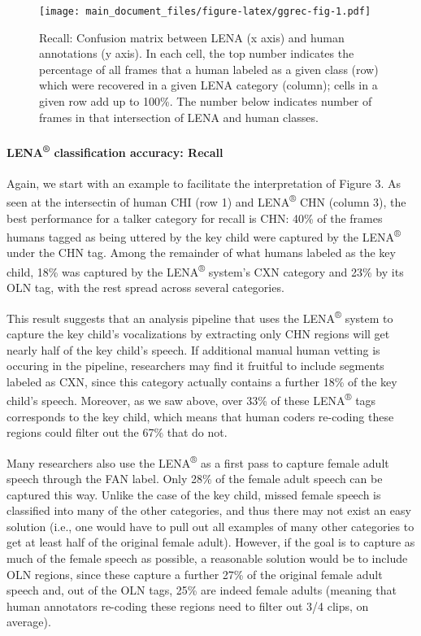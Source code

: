 \documentclass[english,floatsintext,man]{apa6}
\begin{document}
\begin{figure}
\centering
\texttt{[image: main\_document\_files/figure-latex/ggrec-fig-1.pdf]}
\caption{\label{fig:ggrec-fig}Recall: Confusion matrix between LENA (x axis)
and human annotations (y axis). In each cell, the top number indicates
the percentage of all frames that a human labeled as a given class (row)
which were recovered in a given LENA category (column); cells in a given
row add up to 100\%. The number below indicates number of frames in that
intersection of LENA and human classes.}
\end{figure}

\paragraph{\texorpdfstring{LENA\textsuperscript{®} classification
accuracy:
Recall}{LENA® classification accuracy: Recall}}\label{lena-classification-accuracy-recall}

Again, we start with an example to facilitate the interpretation of
Figure 3. As seen at the intersectin of human CHI (row 1) and
LENA\textsuperscript{®} CHN (column 3), the best performance for a
talker category for recall is CHN: 40\% of the frames humans tagged as
being uttered by the key child were captured by the
LENA\textsuperscript{®} under the CHN tag. Among the remainder of what
humans labeled as the key child, 18\% was captured by the
LENA\textsuperscript{®} system's CXN category and 23\% by its OLN tag,
with the rest spread across several categories.

This result suggests that an analysis pipeline that uses the
LENA\textsuperscript{®} system to capture the key child's vocalizations
by extracting only CHN regions will get nearly half of the key child's
speech. If additional manual human vetting is occuring in the pipeline,
researchers may find it fruitful to include segments labeled as CXN,
since this category actually contains a further 18\% of the key child's
speech. Moreover, as we saw above, over 33\% of these
LENA\textsuperscript{®} tags corresponds to the key child, which means
that human coders re-coding these regions could filter out the 67\% that
do not.

Many researchers also use the LENA\textsuperscript{®} as a first pass to
capture female adult speech through the FAN label. Only 28\% of the
female adult speech can be captured this way. Unlike the case of the key
child, missed female speech is classified into many of the other
categories, and thus there may not exist an easy solution (i.e., one
would have to pull out all examples of many other categories to get at
least half of the original female adult). However, if the goal is to
capture as much of the female speech as possible, a reasonable solution
would be to include OLN regions, since these capture a further 27\% of
the original female adult speech and, out of the OLN tags, 25\% are
indeed female adults (meaning that human annotators re-coding these
regions need to filter out 3/4 clips, on average).
\end{document}
